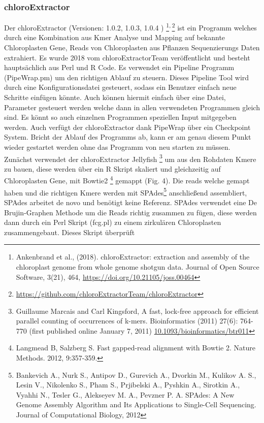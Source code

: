 \documentclass{scrartcl}
\begin{document}
\subsubsection{chloroExtractor}
\label{sec-2-5-1}
Der chloroExtractor (Versionen: 1.0.2, 1.0.3, 1.0.4 ) \footnote{Ankenbrand et al., (2018). chloroExtractor: extraction and assembly of the chloroplast genome from whole genome shotgun data. Journal of Open Source Software, 3(21), 464, \url{https://doi.org/10.21105/joss.00464}}\textsuperscript{,}\,\footnote{\url{https://github.com/chloroExtractorTeam/chloroExtractor}} ist ein Programm welches durch eine Kombination aus Kmer Analyse und Mapping auf bekannte Chloroplasten Gene, Reads von Chloroplasten aus Pflanzen Sequenzierungs Daten
extrahiert. Es wurde 2018 vom chloroExtractorTeam veröffentlicht \footnotemark[15]{} und besteht hauptsächlich aus Perl und R Code. Es verwendet ein Pipeline Programm (PipeWrap.pm) um den richtigen Ablauf zu steuern.
Dieses Pipeline Tool wird durch eine Konfigurationsdatei gesteuert, sodass ein Benutzer einfach neue Schritte einfügen könnte. Auch können hiermit einfach über eine Datei, Parameter gesteuert werden welche dann in 
allen verwendeten Programmen gleich sind. Es könnt so auch einzelnen Programmen speziellen Input mitgegeben werden. Auch verfügt der chloroExtractor dank PipeWrap über ein Checkpoint System. Bricht der Ablauf des Programms
ab, kann er am genau diesem Punkt wieder gestartet werden ohne das Programm von neu starten zu müssen. Zunächst verwendet der chloroExtractor Jellyfish \footnote{Guillaume Marcais and Carl Kingsford, A fast, lock-free approach for efficient parallel counting of occurrences of k-mers. Bioinformatics (2011) 27(6): 764-770 (first published online January 7, 2011) \url{10.1093/bioinformatics/btr011}} um aus den Rohdaten Kmere zu bauen, diese werden über ein R
Skript skaliert und gleichzeitig auf Chloroplasten Gene, mit Bowtie2 \footnote{Langmead B, Salzberg S. Fast gapped-read alignment with Bowtie 2. Nature Methods. 2012, 9:357-359.} gemappt (Fig. 4). Die reads welche gemapt haben und die richtigen Kmere werden mit SPAdes\footnote{Bankevich A., Nurk S., Antipov D., Gurevich A., Dvorkin M., Kulikov A. S., Lesin V., Nikolenko S., Pham S., Prjibelski A., Pyshkin A., Sirotkin A., Vyahhi N., Tesler G., Alekseyev M. A., Pevzner P. A. SPAdes: A New Genome Assembly Algorithm and Its Applications to Single-Cell Sequencing.        Journal of Computational Biology, 2012} anschließend assembliert, SPAdes arbeitet de novo und benötigt
keine Referenz. SPAdes verwendet eine De Brujin-Graphen Methode um die Reads richtig zusammen zu fügen, diese werden dann durch ein Perl Skript (fcg.pl) zu einem zirkulären Chloroplasten zusammengebaut. Dieses Skript überprüft
\end{document}
